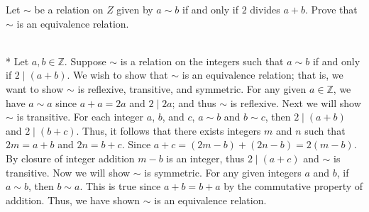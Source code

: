 \documentclass[10pt]{article}
\makeatletter
\newcommand{\Z}{\mathbb{Z}}
\newenvironment{question}[2][Question]{\begin{trivlist}
\item[\hskip \labelsep {\bfseries #1}\hskip \labelsep {\bfseries #2.}]}{\end{trivlist}}
\renewenvironment{proof}[1][\proofname]{\par
\pushQED{\qed}
\normalfont \topsep6\p@\@plus6\p@\relax
\trivlist
\item[\hskip\labelsep\itshape#1\@addpunct{.}]\mbox{}\\*}{\popQED\endtrivlist\@endpefalse}
\makeatother
\begin{document}
\begin{question}{5}
	Let $\sim$ be a relation on $Z$ given by $a \sim b$ if and only if $2$ divides $a+b$. Prove that $\sim$ is an equivalence relation.
	\begin{proof}
		Let $a, b \in \Z$. Suppose $\sim$ is a relation on the integers such that $a \sim b$ if and only if $2 \mid (a + b)$. We wish to show that $\sim$ is an equivalence relation; that is, we want to show $\sim$ is reflexive, transitive, and symmetric.
		For any given $a \in \Z$, we have $a \sim a$ since $a+a =2a$ and $2 \mid 2a$; and thus $\sim$ is reflexive.
        Next we will show $\sim$ is transitive. For each integer $a$, $b$, and $c$, $a \sim b$ and $b \sim c$, then $2 \mid (a + b)$ and $2 \mid (b + c)$. Thus, it follows that there exists integers $m$ and $n$ such that $2m = a + b$ and $2n=b +c$. Since $a + c = (2m -b) + (2n -b) = 2(m-b)$. By closure of integer addition $m-b$ is an integer, thus $2 \mid (a +c)$ and $\sim$ is transitive. Now we will show $\sim$ is symmetric. For any given integers $a$ and $b$, if $a \sim b$, then $b \sim a$. This is true since $a + b = b + a$ by the commutative property of addition. Thus, we have shown $\sim$ is an equivalence relation.
	\end{proof}
\end{question}

\vspace{1mm}
\end{document}
